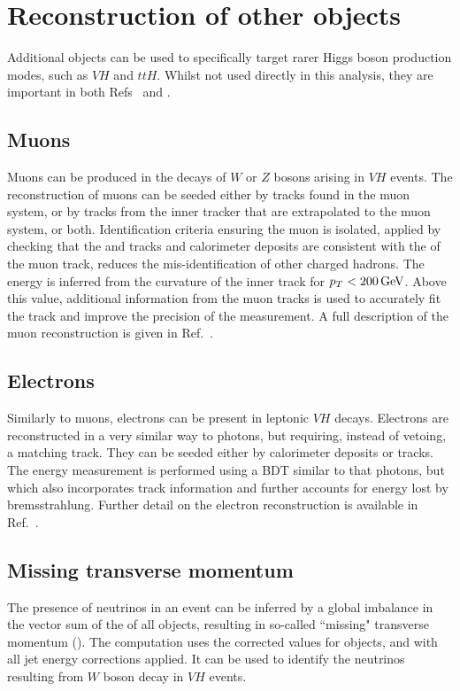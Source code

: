 \section{Reconstruction of other objects}

Additional objects can be used to specifically target rarer Higgs boson production modes, such as $VH$ and $ttH$.
Whilst not used directly in this analysis, they are important in both Refs~\cite{HIG-16-040} and \cite{HIG-18-018}.

\subsection{Muons}

Muons can be produced in the decays of $W$ or $Z$ bosons arising in $VH$ events.
The reconstruction of muons can be seeded either by tracks found in the muon system, 
or by tracks from the inner tracker that are extrapolated to the muon system, or both.
Identification criteria ensuring the muon is isolated, 
applied by checking that the \pt and tracks and calorimeter deposits are consistent with the \pt of the muon track, 
reduces the mis-identification of other charged hadrons.
The energy is inferred from the curvature of the inner track for $p_T < \SI{200}{GeV}$.
Above this value, additional information from the muon tracks is used to accurately fit the track
and improve the precision of the \pt measurement.
A full description of the muon reconstruction is given in Ref.~\cite{MuonReco}.


\subsection{Electrons}

Similarly to muons, electrons can be present in leptonic $VH$ decays.
Electrons are reconstructed in a very similar way to photons, 
but requiring, instead of vetoing, a matching track.
They can be seeded either by calorimeter deposits or tracks.
The energy measurement is performed using a BDT similar to that photons, 
but which also incorporates track information and further accounts for energy lost by bremsstrahlung.
Further detail on the electron reconstruction is available in Ref.~\cite{ElectronReco}.

\subsection{Missing transverse momentum}

The presence of neutrinos in an event can be inferred by a global imbalance in the vector sum of the \pt of all objects, 
resulting in so-called ``missing" transverse momentum (\met).
The \met computation uses the corrected \pt values for objects, and with all jet energy corrections applied.
It can be used to identify the neutrinos resulting from $W$ boson decay in $VH$ events.

